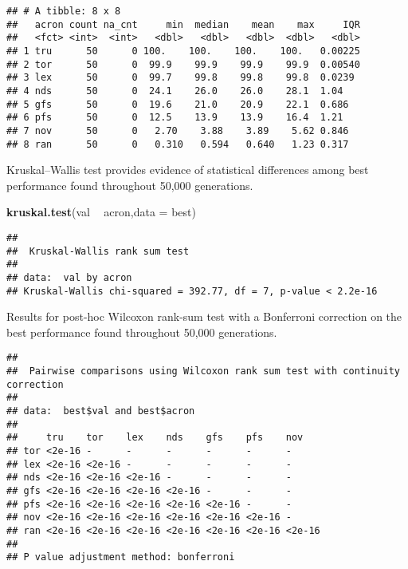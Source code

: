 \documentclass[]{book}
\newenvironment{Shaded}{\begin{snugshade}}{\end{snugshade}}
\newcommand{\DataTypeTok}[1]{\textcolor[rgb]{0.13,0.29,0.53}{#1}}
\newcommand{\KeywordTok}[1]{\textcolor[rgb]{0.13,0.29,0.53}{\textbf{#1}}}
\newcommand{\NormalTok}[1]{#1}
\newcommand{\OperatorTok}[1]{\textcolor[rgb]{0.81,0.36,0.00}{\textbf{#1}}}
\newcommand{\OtherTok}[1]{\textcolor[rgb]{0.56,0.35,0.01}{#1}}
\newcommand{\StringTok}[1]{\textcolor[rgb]{0.31,0.60,0.02}{#1}}
\begin{document}
\begin{verbatim}
## # A tibble: 8 x 8
##   acron count na_cnt     min  median    mean    max     IQR
##   <fct> <int>  <int>   <dbl>   <dbl>   <dbl>  <dbl>   <dbl>
## 1 tru      50      0 100.    100.    100.    100.   0.00225
## 2 tor      50      0  99.9    99.9    99.9    99.9  0.00540
## 3 lex      50      0  99.7    99.8    99.8    99.8  0.0239 
## 4 nds      50      0  24.1    26.0    26.0    28.1  1.04   
## 5 gfs      50      0  19.6    21.0    20.9    22.1  0.686  
## 6 pfs      50      0  12.5    13.9    13.9    16.4  1.21   
## 7 nov      50      0   2.70    3.88    3.89    5.62 0.846  
## 8 ran      50      0   0.310   0.594   0.640   1.23 0.317
\end{verbatim}

Kruskal--Wallis test provides evidence of statistical differences among best performance found throughout 50,000 generations.

\begin{Shaded}
\begin{Highlighting}[]
\KeywordTok{kruskal.test}\NormalTok{(val }\OperatorTok{~}\StringTok{ }\NormalTok{acron,}\DataTypeTok{data =}\NormalTok{ best)}
\end{Highlighting}
\end{Shaded}

\begin{verbatim}
## 
##  Kruskal-Wallis rank sum test
## 
## data:  val by acron
## Kruskal-Wallis chi-squared = 392.77, df = 7, p-value < 2.2e-16
\end{verbatim}

Results for post-hoc Wilcoxon rank-sum test with a Bonferroni correction on the best performance found throughout 50,000 generations.

\begin{Shaded}
\end{Shaded}

\begin{verbatim}
## 
##  Pairwise comparisons using Wilcoxon rank sum test with continuity correction 
## 
## data:  best$val and best$acron 
## 
##     tru    tor    lex    nds    gfs    pfs    nov   
## tor <2e-16 -      -      -      -      -      -     
## lex <2e-16 <2e-16 -      -      -      -      -     
## nds <2e-16 <2e-16 <2e-16 -      -      -      -     
## gfs <2e-16 <2e-16 <2e-16 <2e-16 -      -      -     
## pfs <2e-16 <2e-16 <2e-16 <2e-16 <2e-16 -      -     
## nov <2e-16 <2e-16 <2e-16 <2e-16 <2e-16 <2e-16 -     
## ran <2e-16 <2e-16 <2e-16 <2e-16 <2e-16 <2e-16 <2e-16
## 
## P value adjustment method: bonferroni
\end{verbatim}
\end{document}
